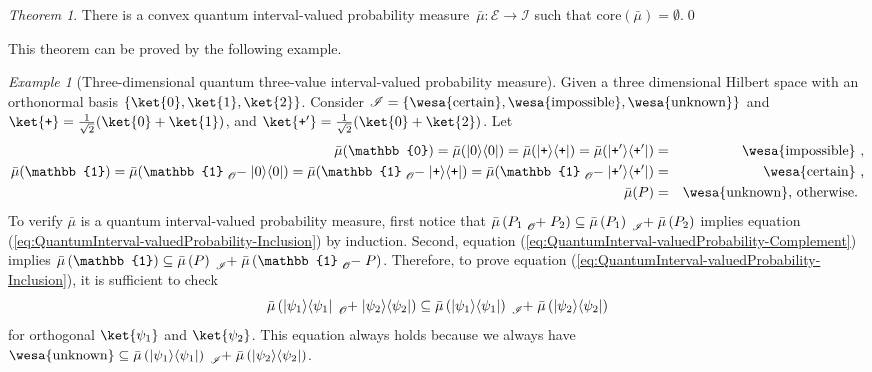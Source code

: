 \documentclass{article}
\theoremstyle{remark}
\newtheorem{example}{Example}
\newtheorem{thm}{Theorem}
\newcommand{\events}{\ensuremath{\mathcal{E}}}
\newcommand{\ps}{\texttt{+}}
\newcommand{\imposs}{{\mbox{\wesa{impossible}}}}
\newcommand{\necess}{{\mbox{\wesa{certain}}}}
\newcommand{\unknown}{{\mbox{\wesa{unknown}}}}
\newcommand{\op}[2]{\ensuremath{\left\vert{#1}\middle\rangle\middle\langle{#2}\right\vert}}
\newcommand{\proj}[1]{\op{#1}{#1}}
\begin{document}
\begin{thm}\label{def:EmptyCoreQuantumInterval-valuedProbability}
There is a convex quantum interval-valued probability measure~$\bar{\mu}:\events\rightarrow\mathscr{I}$
such that $\mathrm{core}\left(\bar{\mu}\right)=\emptyset$.\qed\end{thm}

This theorem can be proved by the following example. 

\begin{example}[Three-dimensional quantum three-value interval-valued
probability measure]\label{ex:three-dimensional-three-value} Given
a three dimensional Hilbert space with an orthonormal basis $\left\{ \ket{0},\ket{1},\ket{2}\right\} $.
Consider\emph{ $\mathscr{I}=\left\{ \necess,\imposs,\unknown\right\} $}
and $\ket{\ps}=\frac{1}{\sqrt{2}}(\ket{0}+\ket{1})$, and $\ket{\ps'}=\frac{1}{\sqrt{2}}(\ket{0}+\ket{2})$.
Let 
\begin{eqnarray*}
\bar{\mu}(\mathbb{0})=\bar{\mu}(\proj{0})=\bar{\mu}(\proj{\ps})=\bar{\mu}(\proj{\ps'}) & = & \imposs\textrm{ ,}\\
\bar{\mu}(\mathbb{1})=\bar{\mu}(\mathbb{1}\tensor*[_{\mathscr{O}}]{-}{}\proj{0})=\bar{\mu}(\mathbb{1}\tensor*[_{\mathscr{O}}]{-}{}\proj{\ps})=\bar{\mu}(\mathbb{1}\tensor*[_{\mathscr{O}}]{-}{}\proj{\ps'}) & = & \necess\textrm{ ,}\\
\bar{\mu}(P) & = & \unknown\textrm{, otherwise. }
\end{eqnarray*}
To verify $\bar{\mu}$ is a quantum interval-valued probability measure,
first notice that $\bar{\mu}\left(P_{1}\tensor*[_{\mathscr{O}}]{+}{}P_{2}\right)\subseteq\bar{\mu}\left(P_{1}\right)\tensor*[_{\mathscr{I}}]{+}{}\bar{\mu}\left(P_{2}\right)$
implies equation (\ref{eq:QuantumInterval-valuedProbability-Inclusion})
by induction. Second, equation (\ref{eq:QuantumInterval-valuedProbability-Complement})
implies $\bar{\mu}\left(\mathbb{1}\right)\subseteq\bar{\mu}\left(P\right)\tensor*[_{\mathscr{I}}]{+}{}\bar{\mu}\left(\mathbb{1}\tensor*[_{\mathscr{O}}]{-}{}P\right)$.
Therefore, to prove equation (\ref{eq:QuantumInterval-valuedProbability-Inclusion}),
it is sufficient to check 
\[
\bar{\mu}\left(\proj{\psi_{1}}\tensor*[_{\mathscr{O}}]{+}{}\proj{\psi_{2}}\right)\subseteq\bar{\mu}\left(\proj{\psi_{1}}\right)\tensor*[_{\mathscr{I}}]{+}{}\bar{\mu}\left(\proj{\psi_{2}}\right)
\]
for orthogonal $\ket{\psi_{1}}$ and $\ket{\psi_{2}}$. This equation
always holds because we always have $\unknown\subseteq\bar{\mu}\left(\proj{\psi_{1}}\right)\tensor*[_{\mathscr{I}}]{+}{}\bar{\mu}\left(\proj{\psi_{2}}\right)$.


\end{example}
\end{document}
